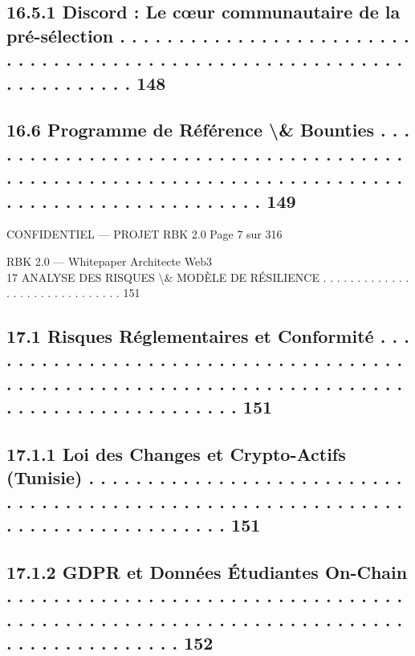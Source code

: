 \documentclass[12pt,landscape,a4paper]{article}
\newenvironment{confidential}
{\begin{tcolorbox}[
    colback=rbkred!5!white,
    colframe=rbkred!75!black,
    title=CONFIDENTIEL,
    fonttitle=\bfseries\color{white},
    coltitle=rbkred!75!black,
    breakable,
    enhanced,
    frame hidden,
    borderline west={2pt}{0pt}{rbkred!75!black}
]}
{\end{tcolorbox}}
\begin{document}
\subsection{16.5.1              Discord : Le cœur communautaire de la pré-sélection . . . . . . . . . . . . . . . . . . . . . . . . . . . . . . . . . . . . . . . . . . . . . . . . . . . . . . . . . . . . . . . . . . . . . . 148}
\subsection{16.6    Programme de Référence \textbackslash{}& Bounties . . . . . . . . . . . . . . . . . . . . . . . . . . . . . . . . . . . . . . . . . . . . . . . . . . . . . . . . . . . . . . . . . . . . . . . . . . . . . . . . . . . . . . . . . . . . . 149}
\vspace{0.5em}
\vspace{0.5em}
\vspace{0.5em}
\begin{confidential}CONFIDENTIEL — PROJET RBK 2.0                                                                              Page 7 sur 316\end{confidential}
RBK 2.0 — Whitepaper Architecte Web3\\
\vspace{0.5em}
\vspace{0.5em}
17    ANALYSE DES RISQUES \textbackslash{}& MODÈLE DE RÉSILIENCE . . . . . . . . . . . . . . . . . . . . . . . . . . . . . . 151\\
\subsection{17.1    Risques Réglementaires et Conformité . . . . . . . . . . . . . . . . . . . . . . . . . . . . . . . . . . . . . . . . . . . . . . . . . . . . . . . . . . . . . . . . . . . . . . . . . . . . . . . . . . . . . . . . . . . 151}
\subsection{17.1.1            Loi des Changes et Crypto-Actifs (Tunisie) . . . . . . . . . . . . . . . . . . . . . . . . . . . . . . . . . . . . . . . . . . . . . . . . . . . . . . . . . . . . . . . . . . . . . . . . . . . . . . . . 151}
\subsection{17.1.2            GDPR et Données Étudiantes On-Chain . . . . . . . . . . . . . . . . . . . . . . . . . . . . . . . . . . . . . . . . . . . . . . . . . . . . . . . . . . . . . . . . . . . . . . . . . . . . . . . . . . . 152}
\end{document}
